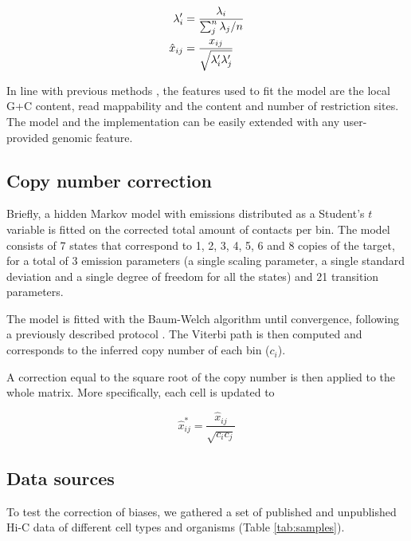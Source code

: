 \documentclass{bioinfo}
\begin{document}
\begin{methods}
\begin{align}
\notag
\lambda_i' &= \frac{\lambda_i}{\sum_j^n{\lambda_j}/n} \\
\label{eq:xhat}
\hat{x}_{ij} &= \frac{x_{ij}}{\sqrt{\lambda_i'\lambda_j'}}
\end{align}

In line with previous methods
\citep{yaffe2011probabilistic,hu2012hicnorm}, the features
used to fit the model are the local G+C content, read mappability and the 
content and number of restriction sites. The model and the implementation
can be easily extended with any user-provided genomic feature.

\subsection{Copy number correction}

Briefly, a hidden Markov model with emissions distributed as a Student's
$t$ variable is fitted on the corrected total amount of contacts per bin.
The model consists of 7 states that correspond to 1, 2, 3, 4, 5, 6 and 8
copies of the target, for a total of 3 emission parameters (a single
scaling parameter, a single standard deviation and a single degree of
freedom for all the states) and 21 transition parameters. 

The model is fitted with the Baum-Welch algorithm \citep{baum1966} until
convergence, following a previously described protocol
\citep{filion2010systematic}.  The Viterbi path is then computed and
corresponds to the inferred copy number of each bin ($c_i$).

A correction equal to the square root of the copy number is then applied
to the whole matrix. More specifically, each cell is updated to


\begin{equation}
\label{eq:cnvnorm}
\hat{x}_{ij}^* = \frac{\hat{x}_{ij}}{\sqrt{c_ic_j}}
\end{equation}

\subsection{Data sources}

To test the correction of biases, we gathered a set of
published \citep{ledily2014distinct, encode2012integrated, rao20143d,
stadhouders2017transcription, lin2012global, dixon2012topological} and
unpublished Hi-C data of different cell types and organisms
(Table \ref{tab:samples}).


\end{methods}
\end{document}
